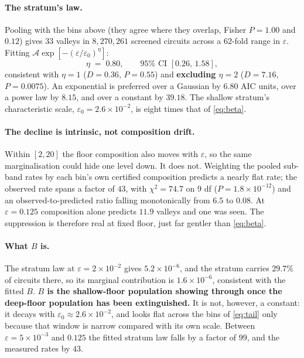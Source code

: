 \documentclass[11pt,a4paper]{article}
\theoremstyle{definition}
\theoremstyle{remark}
\begin{document}
\paragraph{The stratum's law.} Pooling with the bins above (they agree where they overlap, Fisher $P = 1.00$ and $0.12$) gives $33$ valleys in $8{,}270{,}261$ screened circuits across a $62$-fold range in $\varepsilon$. Fitting $\mathcal{A}\exp[-(\varepsilon/\varepsilon_0)^\eta]$:
\begin{equation}\label{eq:stratumeta}
  \eta \;=\; 0.80, \qquad 95\% \text{ CI } [0.26,\, 1.58],
\end{equation}
consistent with $\eta = 1$ ($D = 0.36$, $P = 0.55$) and \textbf{excluding $\eta = 2$} ($D = 7.16$, $P = 0.0075$). An exponential is preferred over a Gaussian by $6.80$ AIC units, over a power law by $8.15$, and over a constant by $39.18$. The shallow stratum's characteristic scale, $\varepsilon_0 = 2.6\times10^{-2}$, is eight times that of \eqref{eq:beta}.

\paragraph{The decline is intrinsic, not composition drift.} Within $[2,20]$ the floor composition also moves with $\varepsilon$, so the same marginalisation could hide one level down. It does not. Weighting the pooled sub-band rates by each bin's own certified composition predicts a nearly flat rate; the observed rate spans a factor of $43$, with $\chi^2 = 74.7$ on 9 df ($P = 1.8\times10^{-12}$) and an observed-to-predicted ratio falling monotonically from $6.5$ to $0.08$. At $\varepsilon = 0.125$ composition alone predicts $11.9$ valleys and one was seen. The suppression is therefore real at fixed floor, just far gentler than \eqref{eq:beta}.

\paragraph{What $B$ is.} The stratum law at $\varepsilon = 2\times10^{-2}$ gives $5.2\times10^{-6}$, and the stratum carries $29.7\%$ of circuits there, so its marginal contribution is $1.6\times10^{-6}$, consistent with the fitted $B$. \textbf{$B$ is the shallow-floor population showing through once the deep-floor population has been extinguished.} It is not, however, a constant: it decays with $\varepsilon_0 \approx 2.6\times10^{-2}$, and looks flat across the bins of \eqref{eq:tail} only because that window is narrow compared with its own scale. Between $\varepsilon = 5\times10^{-3}$ and $0.125$ the fitted stratum law falls by a factor of $99$, and the measured rates by $43$.
\end{document}
